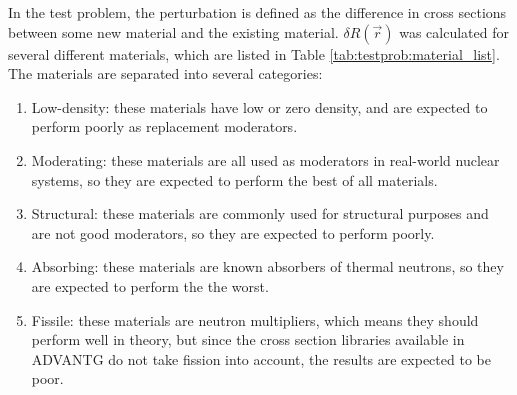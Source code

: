 In the test problem, the perturbation is defined as the difference in cross sections between some new material and the existing material.
$\delta R\left(\vec{r}\right)$ was calculated for several different materials, which are listed in Table \ref{tab:testprob:material_list}.
The materials are separated into several categories:
\begin{enumerate}
  \item Low-density: these materials have low or zero density, and are expected to perform poorly as replacement moderators.
  \item Moderating:  these materials are all used as moderators in real-world nuclear systems, so they are expected to perform the best of all materials.
  \item Structural:  these materials are commonly used for structural purposes and are not good moderators, so they are expected to perform poorly.
  \item Absorbing:   these materials are known absorbers of thermal neutrons, so they are expected to perform the the worst.
  \item Fissile:     these materials are neutron multipliers, which means they should perform well in theory, but since the cross section libraries available in ADVANTG do not take fission into account, the results are expected to be poor.
\end{enumerate}

